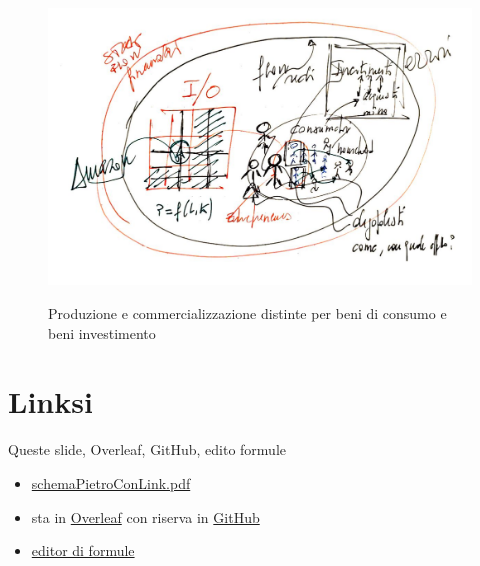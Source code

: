 \documentclass[]{beamer}
\begin{document}
\begin{frame}{~} %



\begin{figure}[H]
\center
\includegraphics[scale=0.50]{7.pdf}
\label{7}
\caption{Produzione e commercializzazione distinte per beni di consumo e beni investimento}
\end{figure}

\end{frame}

\section{Linksi}

\begin{frame}{Queste slide, Overleaf, GitHub, edito formule}

\begin{itemize}

\item
\href{https://terna.to.it/ejmmp/deposito/schemaPietroConLink.pdf}{schemaPietroConLink.pdf}

\item
sta in \href{https://it.overleaf.com/4892961924fddsgrqnbwhh}{Overleaf} con riserva in \href{https://github.com/terna/ejmmpSchemaPietro}{GitHub}

\item
\href{https://editor.codecogs.com}{editor di formule}

\end{itemize}


\end{frame}
\end{document}

